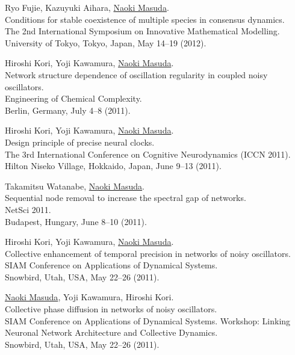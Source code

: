 \documentclass[11pt,letter]{article}
\begin{document}
\begin{etaremune}
\item Ryo Fujie, Kazuyuki Aihara, \underline{Naoki Masuda}.\\
Conditions for stable coexistence of multiple species in consensus dynamics.\\
The 2nd International Symposium on Innovative Mathematical Modelling.\\
University of Tokyo, Tokyo, Japan, May 14--19 (2012).

\item Hiroshi Kori, Yoji Kawamura, \underline{Naoki Masuda}.\\
Network structure dependence of oscillation regularity in coupled noisy oscillators.\\
Engineering of Chemical Complexity.\\
Berlin, Germany, July 4--8 (2011).

\item Hiroshi Kori, Yoji Kawamura, \underline{Naoki Masuda}.\\
Design principle of precise neural clocks.\\
The 3rd International Conference on Cognitive Neurodynamics (ICCN 2011).\\
Hilton Niseko Village, Hokkaido, Japan, June 9--13 (2011).

\item Takamitsu Watanabe, \underline{Naoki Masuda}.\\
Sequential node removal to increase the spectral gap of networks.\\
NetSci 2011.\\
Budapest, Hungary, June 8--10 (2011).

\item Hiroshi Kori, Yoji Kawamura, \underline{Naoki Masuda}.\\
Collective enhancement of temporal precision in networks of noisy oscillators.\\
SIAM Conference on Applications of Dynamical Systems.\\
Snowbird, Utah, USA, May 22--26 (2011).

\item \underline{Naoki Masuda}, Yoji Kawamura, Hiroshi Kori.\\
Collective phase diffusion in networks of noisy oscillators.\\
SIAM Conference on Applications of Dynamical Systems. Workshop: Linking Neuronal Network Architecture and Collective Dynamics.\\
Snowbird, Utah, USA, May 22--26 (2011).


\end{etaremune}
\end{document}
